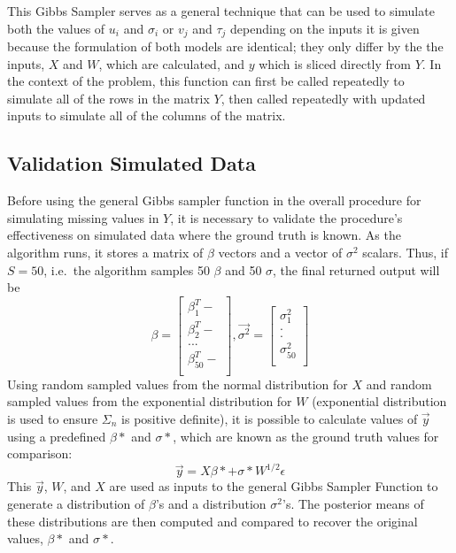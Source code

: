 \documentclass[12pt,twoside]{dukestatscithesis}
\theoremstyle{definition}
\theoremstyle{definition}
\theoremstyle{definition}
\theoremstyle{remark}
\begin{document}
This Gibbs Sampler serves as a general technique that can be used to
simulate both the values of \(u_i\) and \(\sigma_i\) or \(v_j\) and
\(\tau_j\) depending on the inputs it is given because the formulation
of both models are identical; they only differ by the the inputs, \(X\)
and \(W\), which are calculated, and \(y\) which is sliced directly from
\(Y\). In the context of the problem, this function can first be called
repeatedly to simulate all of the rows in the matrix \(Y\), then called
repeatedly with updated inputs to simulate all of the columns of the
matrix.

\subsection{Validation Simulated Data}\label{validation-simulated-data}

Before using the general Gibbs sampler function in the overall procedure
for simulating missing values in \(Y\), it is necessary to validate the
procedure's effectiveness on simulated data where the ground truth is
known. As the algorithm runs, it stores a matrix of \(\beta\) vectors
and a vector of \(\sigma^2\) scalars. Thus, if \(S = 50\), i.e.~the
algorithm samples 50 \(\beta\) and 50 \(\sigma\), the final returned
output will be \[\beta =
  \begin{bmatrix}
    \beta_1^T- \\
    \beta_2^T- \\
    ... \\
    \beta_{50}^T- \\
  \end{bmatrix},
  \vec{\sigma^2} =
  \begin{bmatrix}
    \sigma_1^2 \\
    . \\
    . \\
    \sigma_{50}^2\\
  \end{bmatrix}\]
Using random sampled values from the normal distribution for \(X\) and
random sampled values from the exponential distribution for \(W\)
(exponential distribution is used to ensure \(\Sigma_n\) is positive
definite), it is possible to calculate values of \(\vec{y}\) using a
predefined \(\beta*\) and \(\sigma *\), which are known as the ground
truth values for comparison:
\[\vec{y} = X\beta * + \sigma * W^{1/2}\epsilon\] This \(\vec{y}\),
\(W\), and \(X\) are used as inputs to the general Gibbs Sampler
Function to generate a distribution of \(\beta\)'s and a distribution
\(\sigma^2\)'s. The posterior means of these distributions are then
computed and compared to recover the original values, \(\beta *\) and
\(\sigma *\).
\end{document}
